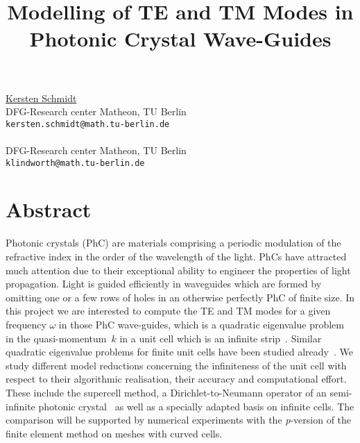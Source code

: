 \title{Modelling of TE and TM Modes in Photonic Crystal Wave-Guides}
 \author{} \institute{}
\maketitle
\begin{center}
{\large \underline{Kersten Schmidt}}\\
DFG-Research center Matheon, TU Berlin\\
{\tt kersten.schmidt@math.tu-berlin.de}
\\ \vspace{4mm}{\large Dirk Klindworth}\\
DFG-Research center Matheon, TU Berlin\\
{\tt klindworth@math.tu-berlin.de}

\end{center}

\section*{Abstract}

Photonic crystals (PhC) are materials comprising a periodic modulation
of the refractive index in the order of the wavelength of the light. %
PhCs have attracted much attention due to their exceptional ability to
engineer the properties of light propagation. %
Light is guided efficiently in waveguides which are formed by omitting
one or a few rows of holes in an otherwise perfectly PhC of finite
size. %
In this project we are interested to compute the TE and TM modes for a
given frequency $\omega$ in those PhC wave-guides, which is a
quadratic eigenvalue problem in the quasi-momentum~$k$ in a unit cell
which is an infinite strip~\cite{Schmidt.Kappeler:2010}. %
Similar quadratic eigenvalue problems for finite unit cells have been
studied already~\cite{Engstroem.Richter:2009}. %
We study different model reductions concerning the infiniteness of the
unit cell with respect to their algorithmic realisation, their
accuracy and computational effort. %
These include the supercell method, a Dirichlet-to-Neumann operator of
an semi-infinite photonic crystal~\cite{Joly.Li.Fliss:2006} as well as
a specially adapted basis on infinite cells. %
The comparison will be supported by numerical experiments with the
{\em p}-version of the finite element method on meshes with curved
cells.

